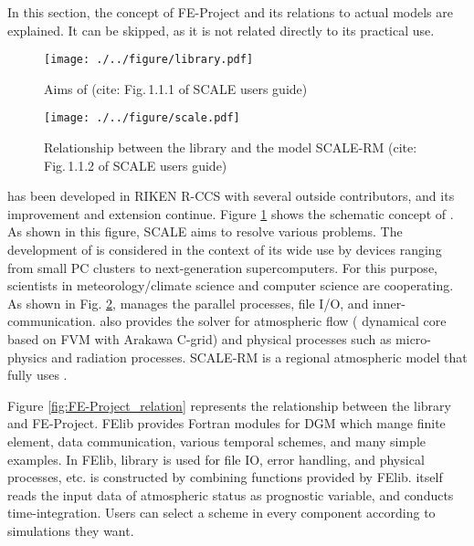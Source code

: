 In this section, 
the concept of FE-Project and its relations to actual models are explained. 
It can be skipped, as it is not related directly to its practical use.

\clearpage
{}

\begin{figure}[htb]
\begin{center}
  \texttt{[image: ./../figure/library.pdf]}\\
  \caption{Aims of \scalelib (cite: Fig.\,1.1.1 of SCALE users guide)}
  \label{fig:scale}
\end{center}
\end{figure}
\begin{figure}[hbt]
\begin{center}
  \texttt{[image: ./../figure/scale.pdf]}\\
  \caption{Relationship between the library \scalelib and the model SCALE-RM (cite: Fig.\,1.1.2 of SCALE users guide)}
  \label{fig:scale-rm}
\end{center}
\end{figure}

\scalelib has been developed in RIKEN R-CCS with several outside contributors,
and its improvement and extension continue.
Figure \ref{fig:scale} shows the schematic concept of \scalelib.
As shown in this figure, SCALE aims to resolve various problems.
The development of \scalelib is considered in the context of its wide use
by devices ranging from small PC clusters to next-generation supercomputers.
For this purpose, scientists in meteorology/climate science
and computer science are cooperating. 
As shown in Fig. \ref{fig:scale-rm}, 
\scalelib manages the parallel processes,
file I/O, and inner-communication. 
\scalelib also provides the solver for atmospheric flow ( dynamical core based on FVM with Arakawa C-grid)
and physical processes such as micro-physics and radiation processes.
SCALE-RM is a regional atmospheric model that fully uses \scalelib.




Figure \ref{fig:FE-Project_relation} represents the relationship between the library \scalelib and FE-Project.
FElib provides Fortran modules for DGM which mange finite element, data communication, various temporal schemes, 
and many simple examples. 
In FElib, \scalelib library is used for file IO, error handling, and physical processes, etc.
\scaledg is constructed by combining functions provided by FElib.
\scaledg itself reads the input data of atmospheric status as prognostic variable,
and conducts time-integration.
Users can select a scheme in every component according to simulations they want.


